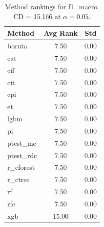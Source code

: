 \begin{table}[h]
\centering
\caption{Method rankings for f1_macro. CD = 15.166 at $\alpha=0.05$.}
\label{tab:ranks_f1_macro}
\begin{tabular}{lcc}
\toprule
Method & Avg Rank & Std \\
\midrule
boruta & 7.50 & 0.00 \\
cat & 7.50 & 0.00 \\
cif & 7.50 & 0.00 \\
cit & 7.50 & 0.00 \\
cpi & 7.50 & 0.00 \\
et & 7.50 & 0.00 \\
lgbm & 7.50 & 0.00 \\
pi & 7.50 & 0.00 \\
ptest_mc & 7.50 & 0.00 \\
ptest_rdc & 7.50 & 0.00 \\
r_cforest & 7.50 & 0.00 \\
r_ctree & 7.50 & 0.00 \\
rf & 7.50 & 0.00 \\
rfe & 7.50 & 0.00 \\
xgb & 15.00 & 0.00 \\
\bottomrule
\end{tabular}
\end{table}